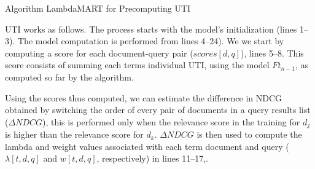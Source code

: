 \documentclass[preprint,review,10pt,3p]{elsarticle}
\begin{document}
\begin{algorithm}[ht!]
\caption{Algorithm LambdaMART for Precomputing UTI }
\label{alg:utilambda}
\SetAlgoLined
{}
\end{algorithm}\DecMargin{1em}


UTI \lambdamart works as follows.
The process starts with the model's initialization (lines 1--3). The model computation is performed from lines 4--24). We we start by computing a score for each document-query pair ($scores[d,q]$), lines 5--8. 
This score consists of summing each terms individual UTI, using the model $Ft_{n-1}$, as computed so far by the algorithm. 

Using the scores thus computed, we can estimate the difference in NDCG obtained by switching the order of every pair of documents in a query results list ($\Delta NDCG$), this is performed only when the relevance score in the training for $d_j$ is higher than the relevance score for $d_k$. $\Delta NDCG$ is then used  to compute the lambda and weight values associated with each term document and query ($\lambda[t,d,q]$ and $w[t,d,q]$, respectively) in lines 11--17,.
\end{document}
